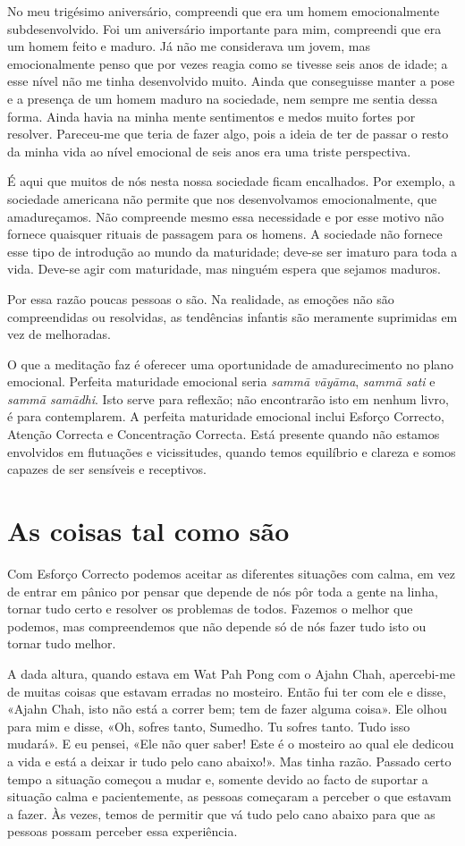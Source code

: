 No meu trigésimo aniversário, compreendi que era um homem emocionalmente
subdesenvolvido. Foi um aniversário importante para mim, compreendi que era um
homem feito e maduro. Já não me considerava um jovem, mas emocionalmente penso
que por vezes reagia como se tivesse seis anos de idade; a esse nível não me
tinha desenvolvido muito. Ainda que conseguisse manter a pose e a presença de um
homem maduro na sociedade, nem sempre me sentia dessa forma. Ainda havia na
minha mente sentimentos e medos muito fortes por resolver. Pareceu-me que teria
de fazer algo, pois a ideia de ter de passar o resto da minha vida ao nível
emocional de seis anos era uma triste perspectiva.

É aqui que muitos de nós nesta nossa sociedade ficam encalhados. Por exemplo, a
sociedade americana não permite que nos desenvolvamos emocionalmente, que
amadureçamos. Não compreende mesmo essa necessidade e por esse motivo não
fornece quaisquer rituais de passagem para os homens. A sociedade não fornece
esse tipo de introdução ao mundo da maturidade; deve-se ser imaturo para toda a
vida. Deve-se agir com maturidade, mas ninguém espera que sejamos maduros.

Por essa razão poucas pessoas o são. Na realidade, as emoções não são
compreendidas ou resolvidas, as tendências infantis são meramente suprimidas em
vez de melhoradas.

O que a meditação faz é oferecer uma oportunidade de amadurecimento no plano
emocional. Perfeita maturidade emocional seria \emph{sammā vāyāma}, \emph{sammā
  sati} e \emph{sammā samādhi}. Isto serve para reflexão; não encontrarão isto
em nenhum livro, é para contemplarem. A perfeita maturidade emocional inclui
Esforço Correcto, Atenção Correcta e Concentração Correcta. Está presente quando
não estamos envolvidos em flutuações e vicissitudes, quando temos equilíbrio e
clareza e somos capazes de ser sensíveis e receptivos.

\section{As coisas tal como são}

Com Esforço Correcto podemos aceitar as diferentes situações com calma, em vez
de entrar em pânico por pensar que depende de nós pôr toda a gente na linha,
tornar tudo certo e resolver os problemas de todos. Fazemos o melhor que
podemos, mas compreendemos que não depende só de nós fazer tudo isto ou tornar
tudo melhor.

A dada altura, quando estava em Wat Pah Pong com o Ajahn Chah, apercebi-me de
muitas coisas que estavam erradas no mosteiro. Então fui ter com ele e disse,
«Ajahn Chah, isto não está a correr bem; tem de fazer alguma coisa». Ele olhou
para mim e disse, «Oh, sofres tanto, Sumedho. Tu sofres tanto. Tudo isso
mudará». E eu pensei, «Ele não quer saber! Este é o mosteiro ao qual ele dedicou
a vida e está a deixar ir tudo pelo cano abaixo!». Mas tinha razão. Passado
certo tempo a situação começou a mudar e, somente devido ao facto de suportar a
situação calma e pacientemente, as pessoas começaram a perceber o que estavam a
fazer. Às vezes, temos de permitir que vá tudo pelo cano abaixo para que as
pessoas possam perceber essa experiência.

